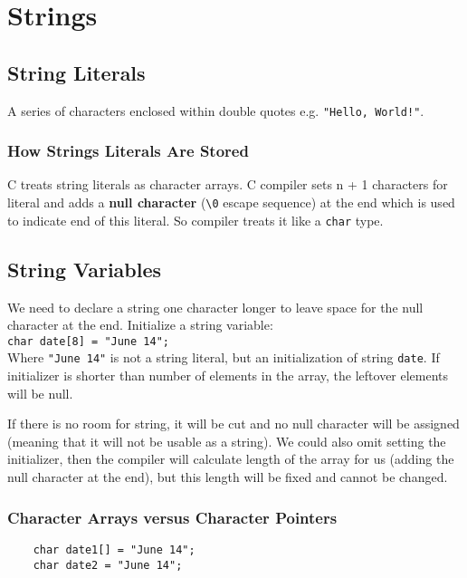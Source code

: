 \documentclass[openany]{book}
\begin{document}
    \chapter{Strings}

    \section{String Literals}
    A series of characters enclosed within double quotes e.g. \texttt{"Hello, World!"}.

    \subsection*{How Strings Literals Are Stored}
    C treats string literals as character arrays. C compiler sets n + 1 characters for literal and adds a \textbf{null character} (\texttt{\textbackslash 0} escape sequence) at the end which is used to indicate end of this literal. So compiler treats it like a \texttt{char} type.

    \section{String Variables}
    We need to declare a string one character longer to leave space for the null character at the
    end. Initialize a string variable: \\
    \texttt{char date[8] = "June 14";} \\
    Where \texttt{"June 14"} is not a string literal, but an initialization of string \texttt{date}. If initializer is shorter than number of elements in the array, the leftover elements will be null.
    \bigskip

    If there is no room for string, it will be cut and no null character will be assigned (meaning that it will not be usable as a string). We could also omit setting the initializer, then the compiler will calculate length of the array for us (adding the null character at the end), but this length will be fixed and cannot be changed.

    \subsection*{Character Arrays versus Character Pointers}
    \begin{lstlisting}
    char date1[] = "June 14";
    char date2 = "June 14";
    \end{lstlisting}
\end{document}
